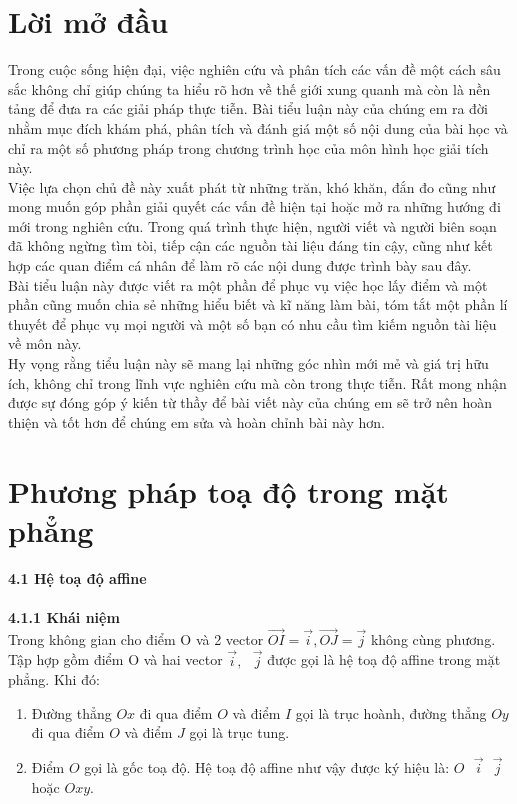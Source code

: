\documentclass[12pt,a4]{article}
\begin{document}
\begin{titlepage}
\section{Lời mở đầu}
Trong cuộc sống hiện đại, việc nghiên cứu và phân tích các vấn đề một cách sâu sắc không chỉ giúp chúng ta hiểu rõ hơn về thế giới xung quanh mà còn là nền tảng để đưa ra các giải pháp thực tiễn. Bài tiểu luận này của chúng em ra đời nhằm mục đích khám phá, phân tích và đánh giá một số nội dung của bài học và chỉ ra một số phương pháp trong chương trình học của môn hình học giải tích này.\\
Việc lựa chọn chủ đề này xuất phát từ những trăn, khó khăn, đắn đo cũng như mong muốn góp phần giải quyết các vấn đề hiện tại hoặc mở ra những hướng đi mới trong nghiên cứu. Trong quá trình thực hiện, người viết và người biên soạn đã không ngừng tìm tòi, tiếp cận các nguồn tài liệu đáng tin cậy, cũng như kết hợp các quan điểm cá nhân để làm rõ các nội dung được trình bày sau đây.\\
Bài tiểu luận này được viết ra một phần để phục vụ việc học lấy điểm và một phần cũng muốn chia sẻ những hiểu biết và kĩ năng làm bài, tóm tắt một phần lí thuyết để phục vụ mọi người và một số bạn có nhu cầu tìm kiếm nguồn tài liệu về môn này.\\
Hy vọng rằng tiểu luận này sẽ mang lại những góc nhìn mới mẻ và giá trị hữu ích, không chỉ trong lĩnh vực nghiên cứu mà còn trong thực tiễn. Rất mong nhận được sự đóng góp ý kiến từ thầy để bài viết này của chúng em sẽ trở nên hoàn thiện và tốt hơn để chúng em sửa và hoàn chỉnh bài này hơn.\\
\section{Phương pháp toạ độ trong mặt phẳng}
\vspace{0.2cm}
\textbf{4.1 Hệ toạ độ affine}\\
\vspace{0.2cm}\\
\textbf{4.1.1 Khái niệm}\\
    Trong không gian cho điểm O và 2 vector $\overrightarrow{OI} = \vec{i}, \overrightarrow{OJ} = \vec{j}$ không cùng phương. Tập hợp gồm điểm O và hai vector $\vec{i}, \text{ } \vec{j}$ được gọi là hệ toạ độ affine trong mặt phẳng. Khi đó:\\
    \begin{enumerate}
        \item Đường thẳng $Ox$ đi qua điểm $O$ và điểm $I$ gọi là trục hoành, đường thẳng $Oy$ đi qua điểm $O$ và điểm $J$ gọi là trục tung.\\
        \item Điểm $O$ gọi là gốc toạ độ. Hệ toạ độ affine như vậy được ký hiệu là: $O\text{ }\vec{i}\text{ }\vec{j}$ hoặc $Oxy$.\\
        \begin{center}
        \begin{tikzpicture}[scale=2]


\end{tikzpicture}
\end{center}
\end{enumerate}
\end{titlepage}
\end{document}
